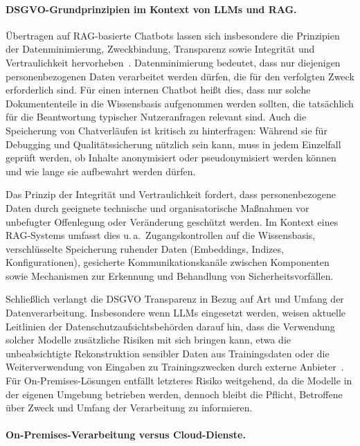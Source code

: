 \paragraph{DSGVO-Grundprinzipien im Kontext von LLMs und RAG.}

Übertragen auf RAG-basierte Chatbots lassen sich insbesondere die Prinzipien der Datenminimierung, Zweckbindung, Transparenz sowie Integrität und Vertraulichkeit hervorheben~\cite{gdpr2016,edpb2024llm}.
Datenminimierung bedeutet, dass nur diejenigen personenbezogenen Daten verarbeitet werden dürfen, die für den verfolgten Zweck erforderlich sind.
Für einen internen Chatbot heißt dies, dass nur solche Dokumententeile in die Wissensbasis aufgenommen werden sollten, die tatsächlich für die Beantwortung typischer Nutzeranfragen relevant sind.
Auch die Speicherung von Chatverläufen ist kritisch zu hinterfragen: Während sie für Debugging und Qualitätssicherung nützlich sein kann, muss in jedem Einzelfall geprüft werden, ob Inhalte anonymisiert oder pseudonymisiert werden können und wie lange sie aufbewahrt werden dürfen.

Das Prinzip der Integrität und Vertraulichkeit fordert, dass personenbezogene Daten durch geeignete technische und organisatorische Maßnahmen vor unbefugter Offenlegung oder Veränderung geschützt werden.
Im Kontext eines RAG-Systems umfasst dies u.\,a.\ Zugangskontrollen auf die Wissensbasis, verschlüsselte Speicherung ruhender Daten (Embeddings, Indizes, Konfigurationen), gesicherte Kommunikationskanäle zwischen Komponenten sowie Mechanismen zur Erkennung und Behandlung von Sicherheitsvorfällen.

Schließlich verlangt die DSGVO Transparenz in Bezug auf Art und Umfang der Datenverarbeitung.
Insbesondere wenn LLMs eingesetzt werden, weisen aktuelle Leitlinien der Datenschutzaufsichtsbehörden darauf hin, dass die Verwendung solcher Modelle zusätzliche Risiken mit sich bringen kann, etwa die unbeabsichtigte Rekonstruktion sensibler Daten aus Trainingsdaten oder die Weiterverwendung von Eingaben zu Trainingszwecken durch externe Anbieter~\cite{edpb2024llm}.
Für On-Premises-Lösungen entfällt letzteres Risiko weitgehend, da die Modelle in der eigenen Umgebung betrieben werden, dennoch bleibt die Pflicht, Betroffene über Zweck und Umfang der Verarbeitung zu informieren.

\paragraph{On-Premises-Verarbeitung versus Cloud-Dienste.}

